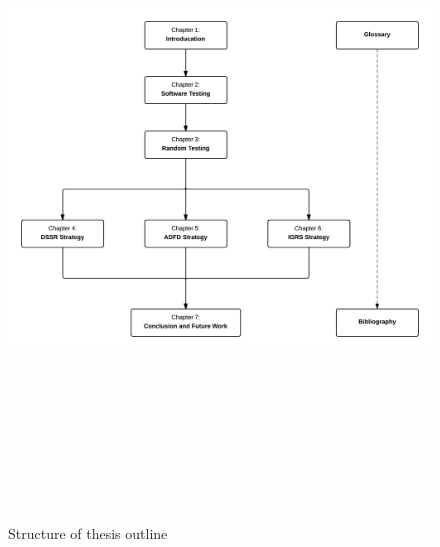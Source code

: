 \newpage
\begin{figure}[h]
	\centering
		\includegraphics[width=15.5cm, height=18cm ]{chapter1/thesisOutline.png}
		\caption{Structure of thesis outline}
	\label{fig:thesisOutline}
\end{figure}






